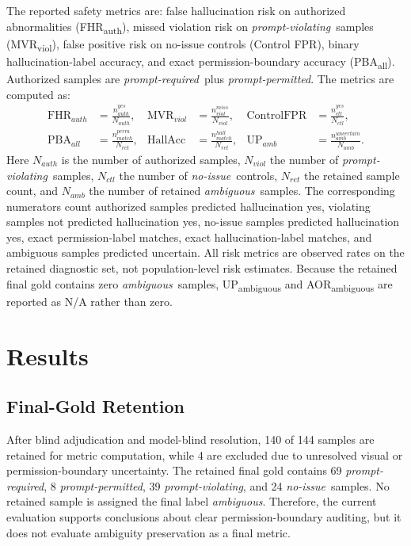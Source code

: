 \documentclass[runningheads]{llncs}
\newcommand{\permrequired}{\emph{prompt-required}}
\newcommand{\permpermitted}{\emph{prompt-permitted}}
\newcommand{\permviolating}{\emph{prompt-violating}}
\newcommand{\permambiguous}{\emph{ambiguous}}
\newcommand{\permnoissue}{\emph{no-issue}}
\begin{document}
The reported safety metrics are: false hallucination risk on authorized abnormalities (FHR\textsubscript{auth}), missed violation risk on \permviolating\ samples (MVR\textsubscript{viol}), false positive risk on no-issue controls (Control FPR), binary hallucination-label accuracy, and exact permission-boundary accuracy (PBA\textsubscript{all}). Authorized samples are \permrequired\ plus \permpermitted. The metrics are computed as:
\[
\begin{aligned}
\mathrm{FHR}_{auth} &= \frac{n^{yes}_{auth}}{N_{auth}}, &
\mathrm{MVR}_{viol} &= \frac{n^{miss}_{viol}}{N_{viol}}, &
\mathrm{ControlFPR} &= \frac{n^{yes}_{ctl}}{N_{ctl}}, \\
\mathrm{PBA}_{all} &= \frac{n^{perm}_{match}}{N_{ret}}, &
\mathrm{HallAcc} &= \frac{n^{hall}_{match}}{N_{ret}}, &
\mathrm{UP}_{amb} &= \frac{n^{uncertain}_{amb}}{N_{amb}}.
\end{aligned}
\]
Here $N_{auth}$ is the number of authorized samples, $N_{viol}$ the number of \permviolating\ samples, $N_{ctl}$ the number of \permnoissue\ controls, $N_{ret}$ the retained sample count, and $N_{amb}$ the number of retained \permambiguous\ samples. The corresponding numerators count authorized samples predicted hallucination yes, violating samples not predicted hallucination yes, no-issue samples predicted hallucination yes, exact permission-label matches, exact hallucination-label matches, and ambiguous samples predicted uncertain.
All risk metrics are observed rates on the retained diagnostic set, not population-level risk estimates. Because the retained final gold contains zero \permambiguous\ samples, UP\textsubscript{ambiguous} and AOR\textsubscript{ambiguous} are reported as N/A rather than zero.

\section{Results}

\subsection{Final-Gold Retention}

After blind adjudication and model-blind resolution, 140 of 144 samples are retained for metric computation, while 4 are excluded due to unresolved visual or permission-boundary uncertainty. The retained final gold contains 69 \permrequired, 8 \permpermitted, 39 \permviolating, and 24 \permnoissue\ samples. No retained sample is assigned the final label \permambiguous. Therefore, the current evaluation supports conclusions about clear permission-boundary auditing, but it does not evaluate ambiguity preservation as a final metric.
\end{document}
